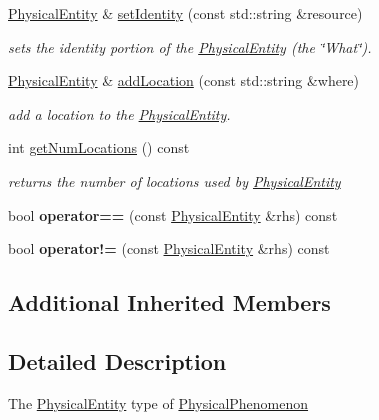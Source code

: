 \begin{DoxyCompactItemize}
\hyperlink{classomexmeta_1_1PhysicalEntity}{Physical\+Entity} \& \hyperlink{classomexmeta_1_1PhysicalEntity_a4d4c3ee9572b19e44e79a44f18f1ac31}{set\+Identity} (const std\+::string \&resource)
\begin{DoxyCompactList}\small\item\em sets the identity portion of the \hyperlink{classomexmeta_1_1PhysicalEntity}{Physical\+Entity} (the \char`\"{}\+What\char`\"{}). \end{DoxyCompactList}\item 
\hyperlink{classomexmeta_1_1PhysicalEntity}{Physical\+Entity} \& \hyperlink{classomexmeta_1_1PhysicalEntity_a82e77be3327c537b2426b571afaa5045}{add\+Location} (const std\+::string \&where)
\begin{DoxyCompactList}\small\item\em add a location to the \hyperlink{classomexmeta_1_1PhysicalEntity}{Physical\+Entity}. \end{DoxyCompactList}\item 
int \hyperlink{classomexmeta_1_1PhysicalEntity_a33559c90dbe3e3be1b71898ab9a5bfa4}{get\+Num\+Locations} () const
\begin{DoxyCompactList}\small\item\em returns the number of locations used by \hyperlink{classomexmeta_1_1PhysicalEntity}{Physical\+Entity} \end{DoxyCompactList}\item 
\mbox{\label{classomexmeta_1_1PhysicalEntity_a5f54e5c2df0fd5c3b9121e1426b23af6}} 
bool {\bfseries operator==} (const \hyperlink{classomexmeta_1_1PhysicalEntity}{Physical\+Entity} \&rhs) const
\item 
\mbox{\label{classomexmeta_1_1PhysicalEntity_afee546a420f16e128ed1add9fec35b4f}} 
bool {\bfseries operator!=} (const \hyperlink{classomexmeta_1_1PhysicalEntity}{Physical\+Entity} \&rhs) const
\end{DoxyCompactItemize}
\subsection*{Additional Inherited Members}


\subsection{Detailed Description}
The \hyperlink{classomexmeta_1_1PhysicalEntity}{Physical\+Entity} type of \hyperlink{classomexmeta_1_1PhysicalPhenomenon}{Physical\+Phenomenon} 

